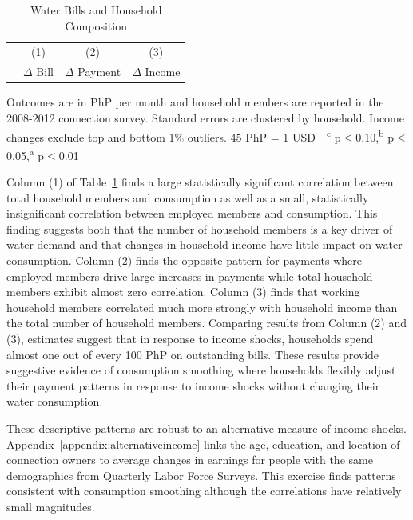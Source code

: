 \documentclass[12pt,table]{article}
\begin{document}
\begin{table}[!ht]
\small
\centering
\begin{threeparttable}
\caption{Water Bills and Household Composition}\label{table:panelanalysis}
\vspace{-2mm}
\begin{tabular}{@{}lccc@{}}
\toprule
 & \small (1) & \small (2) & \small (3)  \\
 & \small $\Delta$ Bill & \small $\Delta$ Payment & \small $\Delta$ Income \\[.5em]
 \toprule

\bottomrule
\end{tabular}
\begin{tablenotes}
\footnotesize
\item Outcomes are in PhP per month and household members are reported in the 2008-2012 connection survey.  Standard errors are clustered by household.  Income changes exclude top and bottom 1\% outliers.   45 PhP = 1 USD \,\, \textsuperscript{c} p$<$0.10,\textsuperscript{b} p$<$0.05,\textsuperscript{a} p$<$0.01 
\end{tablenotes}
\end{threeparttable}
\end{table}

Column (1) of Table~\ref{table:panelanalysis} finds a large statistically significant correlation between total household members and consumption as well as a small, statistically insignificant correlation between employed members and consumption.  This finding suggests both that the number of household members is a key driver of water demand and that changes in household income have little impact on water consumption.  Column (2) finds the opposite pattern for payments where employed members drive large increases in payments while total household members exhibit almost zero correlation.  Column (3) finds that working household members correlated much more strongly with household income than the total number of household members.  Comparing results from Column (2) and (3), estimates suggest that in response to income shocks, households spend almost one out of every 100 PhP on outstanding bills.  These results provide suggestive evidence of consumption smoothing where households flexibly adjust their payment patterns in response to income shocks without changing their water consumption.  

These descriptive patterns are robust to an alternative measure of income shocks.  Appendix~\ref{appendix:alternativeincome} links the age, education, and location of connection owners to average changes in earnings for people with the same demographics from Quarterly Labor Force Surveys.  This exercise finds patterns consistent with consumption smoothing although the correlations have relatively small magnitudes.
\end{document}
